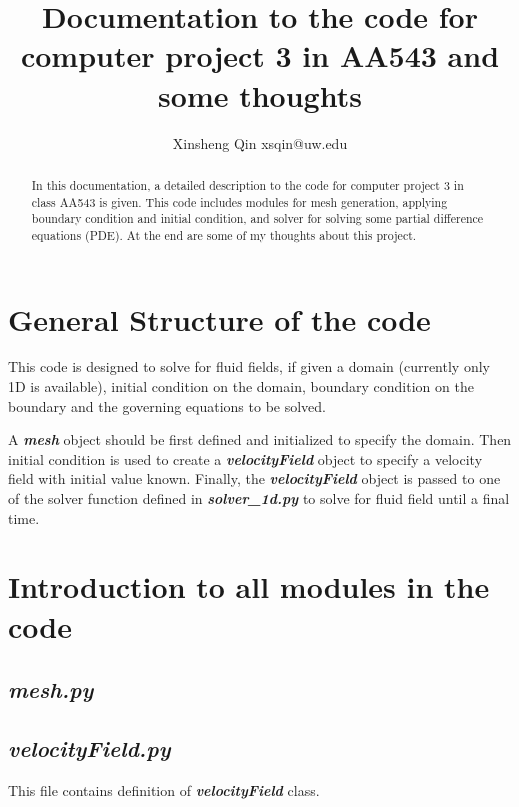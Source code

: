 \documentclass[11pt]{article}
\title{Documentation to the code for computer project 3 in AA543 and some thoughts}
\author{Xinsheng Qin xsqin@uw.edu}
\begin{document}
\maketitle

\begin{abstract}
In this documentation, a detailed description to the code for computer project 3 in class AA543 is given.
This code includes modules for mesh generation, applying boundary condition and initial condition, and solver for solving some partial difference equations (PDE). 
At the end are some of my thoughts about this project.
\end{abstract}

\section{General Structure of the code}
This code is designed to solve for fluid fields, if given a domain (currently only 1D is available), initial condition on the domain, boundary condition on the boundary and the governing equations to be solved.
\par

A \textbf{\textit{mesh}} object should be first defined and initialized to specify the domain. 
Then initial condition is used to create a \textbf{\textit{velocityField}} object to specify a velocity field with initial value known. 
Finally, the \textbf{\textit{velocityField}} object is passed to one of the solver function defined in \textbf{\textit{solver\_1d.py}} to solve for fluid field until a final time. 

\section{Introduction to all modules in the code}
    \subsection{\textbf{\textit{mesh.py}}}
    
    \subsection{\textbf{\textit{velocityField.py}}}
    This file contains definition of \textbf{\textit{velocityField}} class.
\end{document}
